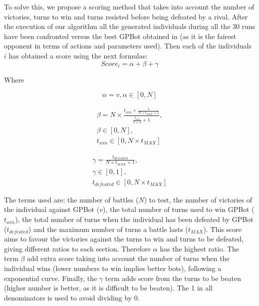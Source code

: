 \documentclass[conference]{IEEEtran}
\begin{document}
To solve this, we propose a scoring method that takes into account the number of victories, turns to win and turns resisted before being defeated %
by a rival. After the execution of our algorithm all the generated individuals during all the 30 runs have been confronted versus the best GPBot obtained in \cite{GarciaGP14} (as it is the fairest opponent in terms of actions and parameters used). Then each of the individuals $i$ has obtained a score using the next formulae:
\begin{equation}
Score_{i}=\alpha+\beta+\gamma
\label{eq:score}
\end{equation}

Where

\begin{equation}
\alpha  = v, \alpha \in\left[0,N\right]
\end{equation}

\begin{equation}
\begin{split}
\beta =N\times\frac{t_{win}+\frac{1}{N\times t_{MAX}+1}}{\frac{t_{win}}{v+1}+1},\\
\beta \in\left[0,N\right], \\
t_{win} \in\left[0,N\times t_{MAX}\right]
\end{split}
\end{equation}

\begin{equation}
\begin{split}
\gamma  =\frac{t_{defeated}}{N \times t_{MAX}+1}, \\
\gamma \in\left[0,1\right], \\
t_{defeated} \in\left[0,N\times t_{MAX}\right]
\end{split}
\end{equation}

The terms used are: the number of battles ($N$) to test, the number of victories of the individual against GPBot ($v$), the total number of turns used to win GPBot ($t_{win}$), the total number of turns when the individual has been defeated by GPBot ($t_{defeated}$) and the maximum number of turns a battle lasts ($t_{MAX}$). This score aims to favour the victories against the turns to win and turns to be defeated, giving different ratios to each section. Therefore $\alpha$ has the highest ratio. The term $\beta$ add extra score taking into account the number of turns when the individual wins (lower numbers to win implies better bots), following a exponential curve.
Finally, the $\gamma$ term adds score from the turns to be beaten (higher number is better, as it is difficult to be beaten). The 1 in all denominators is used to avoid dividing by 0.
\end{document}

